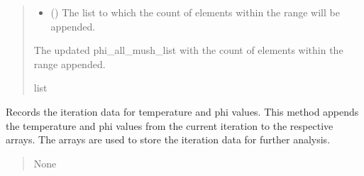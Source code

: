 \documentclass[a4paper,11pt,english,openany]{sphinxmanual}
\begin{document}
\begin{fulllineitems}
\begin{fulllineitems}
\begin{quote}
\begin{description}
\begin{itemize}
\item {} 
\sphinxAtStartPar
{} () \textendash{} The list to which the count of elements within the range will be appended.

\end{itemize}

\sphinxAtStartPar
The updated phi\_all\_mush\_list with the count of elements within the range appended.

\sphinxAtStartPar
list

\end{description}\end{quote}

\end{fulllineitems}


\begin{fulllineitems}
\label{\detokenize{api/spyice.models.sea_ice_model:src.spyice.models.sea_ice_model.SeaIceModel.record_iteration_data}}
\pysigstartsignatures
\pysiglinewithargsret
{}
{}
{}
\pysigstopsignatures
\sphinxAtStartPar
Records the iteration data for temperature and phi values.
This method appends the temperature and phi values from the current iteration to the respective arrays.
The arrays are used to store the iteration data for further analysis.
\begin{quote}\begin{description}
\sphinxAtStartPar
{}

\sphinxAtStartPar
None

\end{description}\end{quote}

\end{fulllineitems}



\end{fulllineitems}
\end{document}
